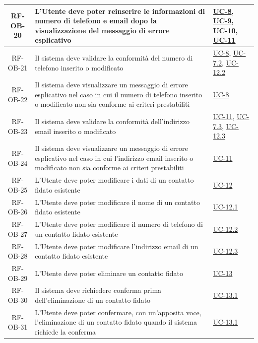 \documentclass[a4paper,12pt]{article}
\begin{document}
\begin{center}
\begin{longtable}{|c|p{8.5cm}|>{\centering\arraybackslash}p{4cm}|}
\hline
\rowcolor{gray!20}
RF-OB-20 & L'Utente deve poter reinserire le informazioni di numero di telefono e email dopo la visualizzazione del messaggio di errore esplicativo & \hyperref[subsec:UC-8]{UC-8}, \hyperref[subsec:UC-9]{UC-9}, \hyperref[subsec:UC-10]{UC-10}, \hyperref[subsec:UC-11]{UC-11} \\
\hline
\rowcolor{white}
RF-OB-21 & Il sistema deve validare la conformità del numero di telefono inserito o modificato & \hyperref[subsec:UC-8]{UC-8}, \hyperref[subsec:UC-7.2]{UC-7.2}, \hyperref[subsec:UC-12.2]{UC-12.2} \\
\hline
\rowcolor{gray!20}
RF-OB-22 & Il sistema deve visualizzare un messaggio di errore esplicativo nel caso in cui il numero di telefono inserito o modificato non sia conforme ai criteri prestabiliti & \hyperref[subsec:UC-8]{UC-8} \\
\hline
\rowcolor{white}
RF-OB-23 & Il sistema deve validare la conformità dell'indirizzo email inserito o modificato & \hyperref[subsec:UC-11]{UC-11}, \hyperref[subsec:UC-7.3]{UC-7.3}, \hyperref[subsec:UC-12.3]{UC-12.3} \\
\hline
\rowcolor{gray!20}
RF-OB-24 & Il sistema deve visualizzare un messaggio di errore esplicativo nel caso in cui l'indirizzo email inserito o modificato non sia conforme ai criteri prestabiliti & \hyperref[subsec:UC-11]{UC-11} \\
\hline
\rowcolor{white}
RF-OB-25 & L'Utente deve poter modificare i dati di un contatto fidato esistente & \hyperref[subsec:UC-12]{UC-12} \\
\hline
\rowcolor{gray!20}
RF-OB-26 & L'Utente deve poter modificare il nome di un contatto fidato esistente & \hyperref[subsec:UC-12.1]{UC-12.1} \\
\hline
\rowcolor{white}
RF-OB-27 & L'Utente deve poter modificare il numero di telefono di un contatto fidato esistente & \hyperref[subsec:UC-12.2]{UC-12.2} \\
\hline
\rowcolor{gray!20}
RF-OB-28 & L'Utente deve poter modificare l'indirizzo email di un contatto fidato esistente & \hyperref[subsec:UC-12.3]{UC-12.3} \\
\hline
\rowcolor{white}
RF-OB-29 & L'Utente deve poter eliminare un contatto fidato & \hyperref[subsec:UC-13]{UC-13} \\
\hline
\rowcolor{gray!20}
RF-OB-30 & Il sistema deve richiedere conferma prima dell'eliminazione di un contatto fidato & \hyperref[subsec:UC-13.1]{UC-13.1} \\
\hline
\rowcolor{white}
RF-OB-31 & L'Utente deve poter confermare, con un'apposita voce, l'eliminazione di un contatto fidato quando il sistema richiede la conferma & \hyperref[subsec:UC-13.1]{UC-13.1} \\

\end{longtable}
\end{center}
\end{document}
